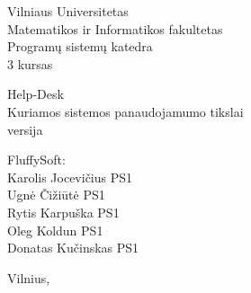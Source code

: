 \begin{titlepage}
    \begin{center}

        {\large
            Vilniaus Universitetas \\
            Matematikos ir Informatikos fakultetas \\
            Programų sistemų katedra \\
            3 kursas
        }

        \vspace{\fill}

        {\huge
            Help-Desk
        } \\[0.5cm]
        {\large
            Kuriamos sistemos panaudojamumo tikslai \\
            \versionString{} versija
        }

        \vspace{3cm}

        \begin{flushright}
            \begin{minipage}{0.4\textwidth}
                FluffySoft: \\
                Karolis Jocevičius PS1\\
                Ugnė Čižiūtė PS1\\
                Rytis Karpuška PS1\\
                Oleg Koldun PS1\\
                Donatas Kučinskas PS1
            \end{minipage}
        \end{flushright}

        \vspace{\fill}

        {\large Vilnius, \the\year}

    \end{center}
\end{titlepage}
